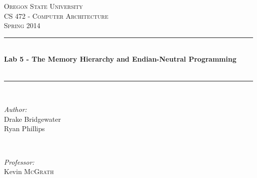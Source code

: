 \documentclass[letterpaper,12pt,titlepage]{article}
\def\name{Drake Bridgewater \\  Ryan Phillips}
\def\title{Lab 5 - The Memory Hierarchy and Endian-Neutral Programming}
\def\subtitle{}
\def\subject{CS }
\def\courseNumber{ 472 }
\def\courseName{Computer Architecture }
\def\courseInfo{Spring 2014 }%
\def\supervisor{Kevin \textsc{McGrath}} %
\begin{document}
\begin{titlepage}

\newcommand{\HRule}{\rule{\linewidth}{0.5mm}} %

\center %
 

\textsc{\LARGE Oregon State University}\\[1.5cm] %
\textsc{\Large \subject \courseNumber - \courseName}\\[0.5cm] %
\textsc{\large \courseInfo}\\[0.5cm] %


\HRule \\[0.4cm]
{ \huge \bfseries \title }\\[0.4cm] %
{\small \textit{\subtitle}}\\[0.4cm]
\HRule \\[1.5cm]
 

\begin{minipage}{0.4\textwidth}
\begin{flushleft} \large
\emph{Author:}\\
\name
\end{flushleft}
\end{minipage}
~
\begin{minipage}{0.4\textwidth}
\begin{flushright} \large
\emph{Professor:} \\
\supervisor
\end{flushright}
\end{minipage}\\[4cm]



\end{titlepage}
\end{document}
